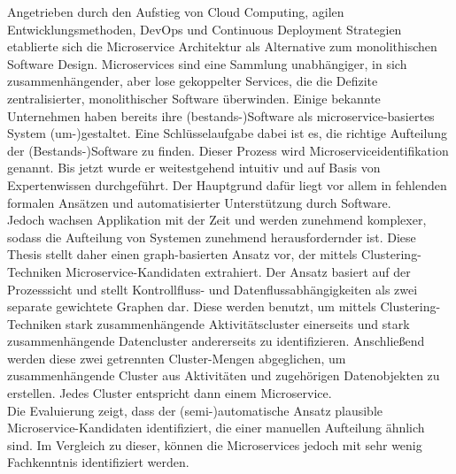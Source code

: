 
\Abstract
Angetrieben durch den Aufstieg von Cloud Computing, agilen Entwicklungsmethoden, DevOps und Continuous Deployment Strategien etablierte sich die Microservice Architektur als Alternative zum monolithischen Software Design. Microservices sind eine Sammlung unabhängiger, in sich zusammenhängender, aber lose gekoppelter Services, die die Defizite zentralisierter, monolithischer Software überwinden. Einige bekannte Unternehmen haben bereits ihre (bestands-)Software als microservice-basiertes System (um-)gestaltet.
Eine Schlüsselaufgabe dabei ist es, die richtige Aufteilung der (Bestands-)Software zu finden. Dieser Prozess wird Microserviceidentifikation genannt. Bis jetzt wurde er weitestgehend intuitiv und auf Basis von Expertenwissen durchgeführt. Der Hauptgrund dafür liegt vor allem in fehlenden formalen Ansätzen und automatisierter Unterstützung durch Software.\\
Jedoch wachsen Applikation mit der Zeit und werden zunehmend komplexer, sodass die Aufteilung von Systemen zunehmend herausfordernder ist. Diese Thesis stellt daher einen graph-basierten Ansatz vor, der mittels Clustering-Techniken Microservice-Kandidaten extrahiert. Der Ansatz basiert auf der Prozesssicht und stellt Kontrollfluss- und Datenflussabhängigkeiten als zwei separate gewichtete Graphen dar. Diese werden benutzt, um mittels Clustering-Techniken stark zusammenhängende Aktivitätscluster einerseits und stark zusammenhängende Datencluster andererseits zu identifizieren. Anschließend werden diese zwei getrennten Cluster-Mengen abgeglichen, um zusammenhängende Cluster aus Aktivitäten und zugehörigen Datenobjekten zu erstellen. Jedes Cluster entspricht dann einem Microservice. \\
Die Evaluierung zeigt, dass der (semi-)automatische Ansatz plausible Microservice-Kandidaten identifiziert, die einer manuellen Aufteilung ähnlich sind. Im Vergleich zu dieser, können die Microservices jedoch mit sehr wenig Fachkenntnis identifiziert werden.

